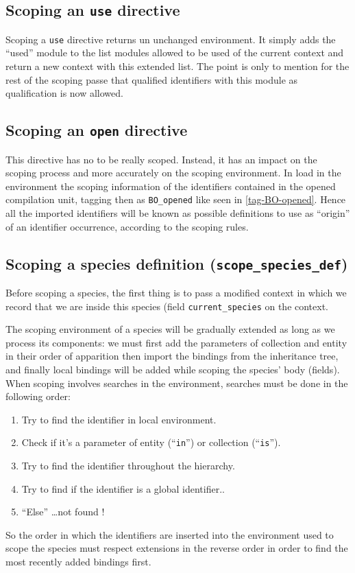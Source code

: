 \subsection{Scoping an {\tt use} directive}
Scoping a {\tt use} directive returns un unchanged environment.
It simply adds the ``used'' module to the list modules allowed to be
used of the current context and return a new context with this
extended list. The point is only to mention for the rest of the
scoping passe that qualified identifiers with this module as
qualification is now allowed.


\subsection{Scoping an {\tt open} directive}
This directive has no to be really scoped. Instead, it has an impact
on the scoping process and more accurately on the scoping environment.
In load in the environment the scoping information of the identifiers
contained in the opened compilation unit, tagging then as
{\tt BO\_opened} like seen in \ref{tag-BO-opened}. Hence all the
imported identifiers will be known as possible definitions to use as
``origin'' of an identifier occurrence, according to the scoping
rules.


\subsection{Scoping a species definition ({\tt scope\_species\_def})}
Before scoping a species, the first thing is to pass a modified
context in which we record that we are inside this species (field
{\tt current\_species} on the context.

The scoping environment of a species will be gradually extended as
long as we process its components: we must first add the parameters of
collection and entity in their order of apparition then import the
bindings from the inheritance tree, and finally local bindings will be
added while scoping the species' body (fields). When scoping involves
searches in the environment, searches must be done in the following
order:
\begin{enumerate}
\item Try to find the identifier in local environment.
\item Check if it's a parameter of entity (``{\tt in}'') or collection
  (``{\tt is}'').
\item Try to find the identifier throughout the hierarchy.
\item Try to find if the identifier is a global identifier..
\item ``Else'' \ldots not found !
\end{enumerate}
So the order in which the identifiers are inserted into the
environment used to scope the species must respect extensions in the
reverse order in order to find the most recently added bindings first.

